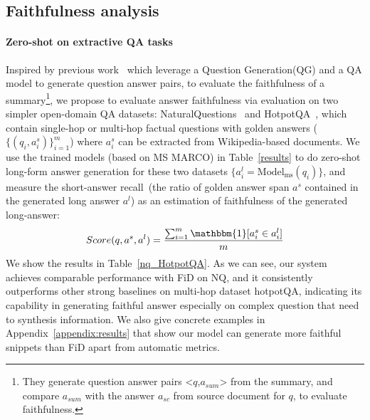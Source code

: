 \documentclass[11pt]{article}
\begin{document}
\vspace{-5pt}
\subsection{Faithfulness analysis}
\vspace{-3pt}

\paragraph{Zero-shot on extractive QA tasks}  Inspired by previous work~\cite{wang2020asking, durmus2020feqa} which leverage a Question Generation(QG) and a QA model to generate question answer pairs, to evaluate the faithfulness of a summary\footnote{
They generate question answer pairs <$q$,$a_{sum}$> from the summary, and compare $a_{sum}$ with the answer $a_{sc}$ from source document for $q$, to evaluate faithfulness.}, we propose to evaluate answer faithfulness via evaluation on two simpler open-domain QA datasets: NaturalQuestions~\cite{kwiatkowski2019natural} and HotpotQA~\cite{yang2018HotpotQA}, which contain single-hop or multi-hop factual questions with golden answers ($\{(q_i, a^s_i)\}_{i=1}^m$) where $a_i^s$ can be extracted from Wikipedia-based documents. We use the trained models (based on MS MARCO) in Table~\ref{results} to do zero-shot long-form answer generation for these two datasets $\{a^l_i = \text{Model}_{\text{ms}}(q_i)\}$, and measure the short-answer recall~(the ratio of golden answer span $a^s$ contained in the generated long answer $a^l$) as an estimation of faithfulness of the generated long-answer:
\begin{equation}
Score(q, a^s, a^l) = \frac{\sum_{i=1}^m\mathbbm{1}[a^s_i \in a^l_i]}{m}
\label{eqa:faithfulness}
\end{equation}
We show the results in Table~\ref{nq_HotpotQA}. As we can see, our system achieves comparable performance with FiD on NQ, and it consistently outperforms other strong baselines on multi-hop dataset hotpotQA, indicating its capability in generating faithful answer especially on complex question that need to synthesis information. We also give concrete examples in Appendix~\ref{appendix:results} that show our model can generate more faithful snippets than FiD apart from automatic metrics. 
\end{document}

